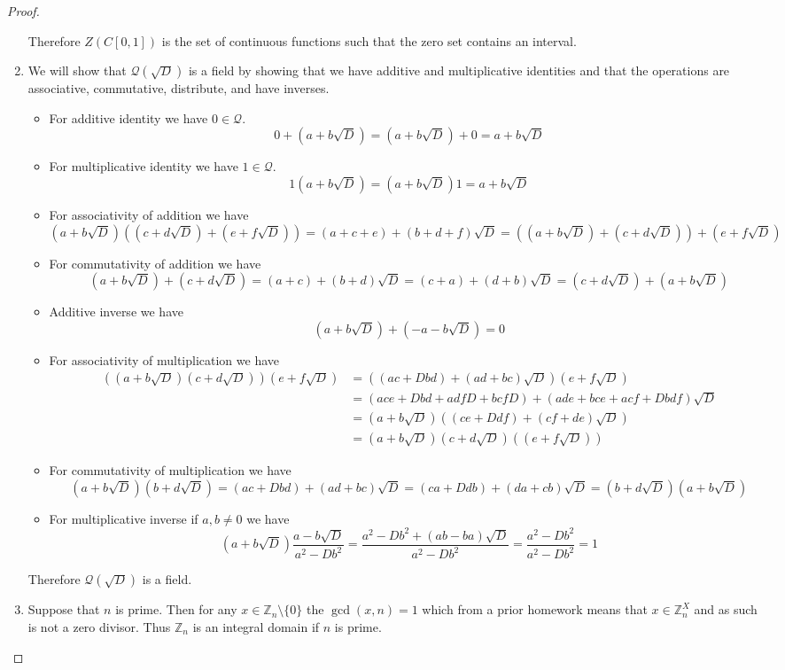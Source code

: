 \documentclass[10pt]{article}
\newcommand{\bb}[1]{\mathbb{#1}}
\theoremstyle{plain}
\theoremstyle{remark}
\begin{document}
\begin{proof}
\begin{enumerate}
    Therefore $Z(C[0,1])$ is the set of continuous functions such that the
    zero set contains an interval.
  \item We will show that $\mathcal{Q}(\sqrt{D})$ is a field by showing that
    we have additive and multiplicative identities and that the operations are
    associative, commutative, distribute, and have inverses.
    \begin{itemize}
    \item For additive identity we have $0\in \mathcal{Q}$.
      \[0+(a+b\sqrt{D})=(a+b\sqrt{D})+0=a+b\sqrt{D}\]
    \item For multiplicative identity we have $1\in\mathcal{Q}$.
      \[ 1(a+b\sqrt{D})=(a+b\sqrt{D})1=a+b\sqrt{D} \]
    \item For associativity of addition we have
      \[ (a+b\sqrt{D})((c+d\sqrt{D})+(e+f\sqrt{D}))
        = (a+c+e)+(b+d+f)\sqrt{D}=((a+b\sqrt{D})+(c+d\sqrt{D}))+(e+f\sqrt{D})\]
    \item For commutativity of addition we have
      \[ (a+b\sqrt{D})+(c+d\sqrt{D})=(a+c)+(b+d)\sqrt{D}=(c+a)+(d+b)\sqrt{D}=
        (c+d\sqrt{D})+(a+b\sqrt{D})\]
    \item Additive inverse we have
      \[ (a+b\sqrt{D})+(-a-b\sqrt{D})=0\]
    \item For associativity of multiplication we have
      \begin{align*}
        ((a+b\sqrt{D})(c+d\sqrt{D}))(e+f\sqrt{D}) &= ((ac+Dbd)+(ad+bc)\sqrt{D})(e+f\sqrt{D})\\
                                                  &= (ace+Dbd+adfD+bcfD)+(ade+bce+acf+Dbdf)\sqrt{D}\\
                                                  &= (a+b\sqrt{D})((ce+Ddf)+(cf+de)\sqrt{D})\\
                                                  &= (a+b\sqrt{D})(c+d\sqrt{D})((e+f\sqrt{D}))
      \end{align*}
    \item For commutativity of multiplication we have
      \[ (a+b\sqrt{D})(b+d\sqrt{D})=(ac+Dbd)+(ad+bc)\sqrt{D}
        = (ca+Ddb)+(da+cb)\sqrt{D} = (b+d\sqrt{D})(a+b\sqrt{D})\]
    \item For multiplicative inverse if $a,b\neq 0$ we have
      \[ (a+b\sqrt{D})\frac{a-b\sqrt{D}}{a^2-Db^2}
        =\frac{a^2-Db^2+(ab-ba)\sqrt{D}}{a^2-Db^2}=\frac{a^2-Db^2}{a^2-Db^2}=1 \]
    \end{itemize}
    Therefore $\mathcal{Q}(\sqrt{D})$ is a field.
  \item Suppose that $n$ is prime. Then for any $x\in \bb{Z}_n\setminus\{0\}$ the $\gcd(x,n)=1$
    which from a prior homework means that $x\in\bb{Z}^X_n$ and as such is not a zero
    divisor. Thus $\bb{Z}_n$ is an integral domain if $n$ is prime.


\end{enumerate}
\end{proof}
\end{document}
